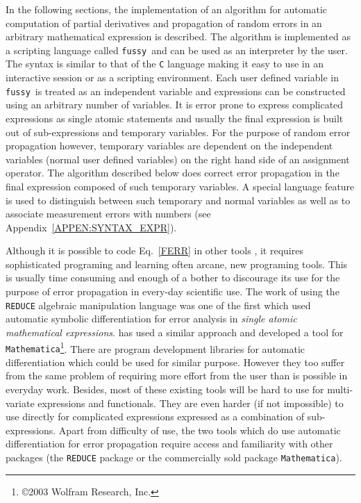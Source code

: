 \documentclass[acmtoms,acmnow]{acmtrans2m}
\newcommand{\Fussy}{{\tt fussy}}
\begin{document}
In the following sections, the implementation of an algorithm for
automatic computation of partial derivatives and propagation of random
errors in an arbitrary mathematical expression is described.  The
algorithm is implemented as a scripting language called \Fussy\ and
can be used as an interpreter by the user.  The syntax is similar to
that of the {\tt C} language making it easy to use in an interactive
session or as a scripting environment.  Each user defined variable in
\Fussy\ is treated as an independent variable and expressions can be
constructed using an arbitrary number of variables.  It is error prone
to express complicated expressions as single atomic statements and
usually the final expression is built out of sub-expressions and
temporary variables.  For the purpose of random error propagation
however, temporary variables are dependent on the independent
variables (normal user defined variables) on the right hand side of an
assignment operator.  The algorithm described below does correct error
propagation in the final expression composed of such temporary
variables.  A special language feature is used to distinguish between
such temporary and normal variables as well as to associate
measurement errors with numbers (see
Appendix~\ref{APPEN:SYNTAX_EXPR}).

Although it is possible to code Eq.~\ref{FERR} in other tools
\cite{Calc,EDA,Bischof1997A-A}, it requires sophisticated programing
and learning often arcane, new programing tools.  This is usually time
consuming and enough of a bother to discourage its use for the purpose
of error propagation in every-day scientific use.  The work of
 using the {\tt REDUCE} algebraic manipulation
language \cite{REDUCE2,REDUCE} was one of the first which used
automatic symbolic differentiation for error analysis in {\it single
  atomic mathematical expressions}.   has used a similar
approach and developed a tool for {\tt
  Mathematica}\footnote{\copyright 2003 Wolfram Research, Inc.}.
There are program development libraries
\cite{ScComp,Griewank:1996:AAP,Tsukanov2003Dsa} for automatic
differentiation which could be used for similar purpose.  However they
too suffer from the same problem of requiring more effort from the
user than is possible in everyday work.  Besides, most of these
existing tools will be hard to use for multi-variate expressions and
functionals.  They are even harder (if not impossible) to use directly
for complicated expressions expressed as a combination of
sub-expressions.  Apart from difficulty of use, the two tools which do
use automatic differentiation for error propagation require access and
familiarity with other packages (the {\tt REDUCE} package or the
commercially sold package {\tt Mathematica}).
\end{document}
